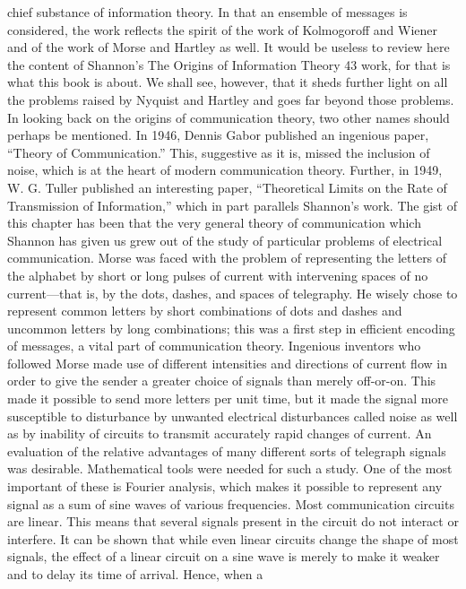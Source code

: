 chief substance of information theory. In that an ensemble of
messages is considered, the work reflects the spirit of the work of
Kolmogoroff and Wiener and of the work of Morse and Hartley
as well.
It would be useless to review here the content of Shannon’s
The Origins of Information Theory
43
work, for that is what this book is about. We shall see, however,
that it sheds further light on all the problems raised by Nyquist
and Hartley and goes far beyond those problems.
In looking back on the origins of communication theory, two
other names should perhaps be mentioned. In 1946, Dennis Gabor
published an ingenious paper, “Theory of Communication.” This,
suggestive as it is, missed the inclusion of noise, which is at the
heart of modern communication theory. Further, in 1949, W. G.
Tuller published an interesting paper, “Theoretical Limits on the
Rate of Transmission of Information,” which in part parallels
Shannon’s work.
The gist of this chapter has been that the very general theory of
communication which Shannon has given us grew out of the study
of particular problems of electrical communication. Morse was
faced with the problem of representing the letters of the alphabet
by short or long pulses of current with intervening spaces of no
current—that is, by the dots, dashes, and spaces of telegraphy. He
wisely chose to represent common letters by short combinations
of dots and dashes and uncommon letters by long combinations;
this was a first step in efficient encoding of messages, a vital part
of communication theory.
Ingenious inventors who followed Morse made use of different
intensities and directions of current flow in order to give the sender
a greater choice of signals than merely off-or-on. This made it
possible to send more letters per unit time, but it made the signal
more susceptible to disturbance by unwanted electrical disturbances
called noise as well as by inability of circuits to transmit
accurately rapid changes of current.
An evaluation of the relative advantages of many different sorts
of telegraph signals was desirable. Mathematical tools were needed
for such a study. One of the most important of these is Fourier
analysis, which makes it possible to represent any signal as a sum
of sine waves of various frequencies.
Most communication circuits are linear. This means that several
signals present in the circuit do not interact or interfere. It can be
shown that while even linear circuits change the shape of most
signals, the effect of a linear circuit on a sine wave is merely to
make it weaker and to delay its time of arrival. Hence, when a

